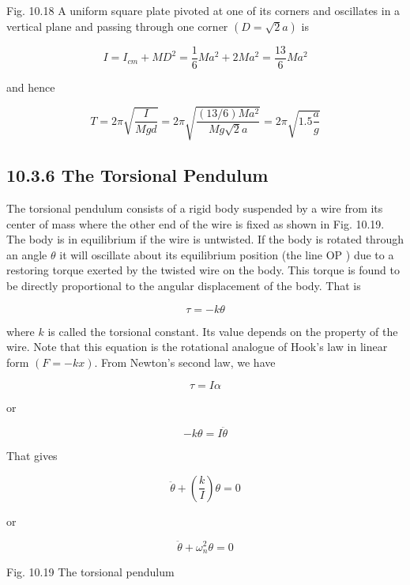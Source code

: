 \documentclass[10pt]{article}
\begin{document}
Fig. 10.18 A uniform square plate pivoted at one of its corners and oscillates in a vertical plane and passing through one corner $(D=\sqrt{2} a)$ is

$$
I=I_{c m}+M D^{2}=\frac{1}{6} M a^{2}+2 M a^{2}=\frac{13}{6} M a^{2}
$$

and hence

$$
T=2 \pi \sqrt{\frac{I}{M g d}}=2 \pi \sqrt{\frac{(13 / 6) M a^{2}}{M g \sqrt{2} a}}=2 \pi \sqrt{1.5 \frac{a}{g}}
$$

\subsection*{10.3.6 The Torsional Pendulum}
The torsional pendulum consists of a rigid body suspended by a wire from its center of mass where the other end of the wire is fixed as shown in Fig. 10.19. The body is in equilibrium if the wire is untwisted. If the body is rotated through an angle $\theta$ it will oscillate about its equilibrium position (the line OP ) due to a restoring torque exerted by the twisted wire on the body. This torque is found to be directly proportional to the angular displacement of the body. That is

$$
\tau=-k \theta
$$

where $k$ is called the torsional constant. Its value depends on the property of the wire. Note that this equation is the rotational analogue of Hook's law in linear form $(F=-k x)$. From Newton's second law, we have

$$
\tau=I \alpha
$$

or

$$
-k \theta=I \ddot{\theta}
$$

That gives

$$
\ddot{\theta}+\left(\frac{k}{I}\right) \theta=0
$$

or

$$
\ddot{\theta}+\omega_{n}^{2} \theta=0
$$

Fig. 10.19 The torsional pendulum
\end{document}
